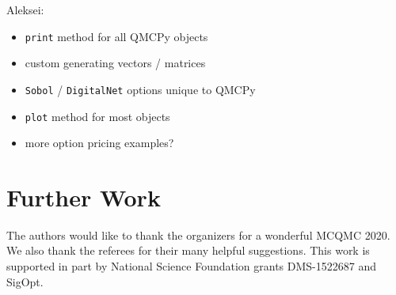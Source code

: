 \documentclass[graybox,footinfo]{svmult}
\newcommand{\AGSComment}[1]{{\color{cyan} Aleksei: #1}}
\begin{document}
\AGSComment{
\begin{itemize}
    \item \texttt{print} method for all QMCPy objects
    \item custom generating vectors / matrices
    \item \texttt{Sobol} / \texttt{DigitalNet} options unique to QMCPy
    \item \texttt{plot} method for most objects
    \item more option pricing examples? 
\end{itemize}}

\section{Further Work} \label{sec:further}


\begin{acknowledgement}
The authors would like to thank the organizers for a wonderful MCQMC 2020. 
We also thank the referees for their many helpful suggestions.  This work is supported in part by National Science Foundation grants DMS-1522687 and SigOpt.


\end{acknowledgement}



\end{document}
